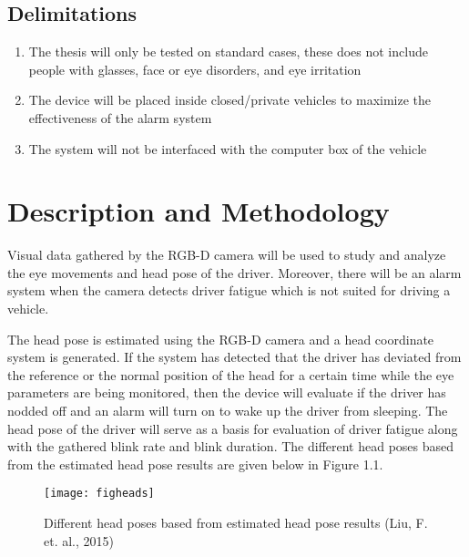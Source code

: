 \subsection{Delimitations}
\begin{enumerate}
	
	\item The thesis will only be tested on standard cases, these does not include people with glasses, face or eye disorders, and eye irritation
	
	
	\item The device will be placed inside closed/private vehicles to maximize the effectiveness of the alarm system
	
	\item The system will not be interfaced with the computer box of the vehicle
	
\end{enumerate}

\section{Description and Methodology}

Visual data gathered by the RGB-D camera will be used to study and analyze the eye movements and head pose of the driver. Moreover, there will be an alarm system when the camera detects driver fatigue which is not suited for driving a vehicle. 

The head pose is estimated using the RGB-D camera and a head coordinate system is generated. If the system has detected that the driver has deviated from the reference or the normal position of the head for a certain time while the eye parameters are being monitored, then the device will evaluate if the driver has nodded off and an alarm will turn on to wake up the driver from sleeping. The head pose of the driver will serve as a basis for evaluation of driver fatigue along with the gathered blink rate and blink duration. The different head poses based from the estimated head pose results are given below in Figure 1.1.
\newline

\begin{figure}[ht]
	\centering
	\texttt{[image: figheads]}
	\caption{Different head poses based from estimated head pose results (Liu, F. et. al., 2015)}
\end{figure}


